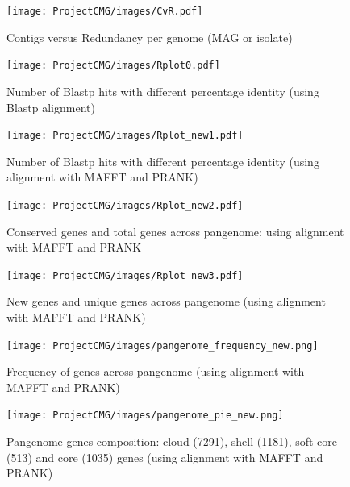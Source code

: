 \documentclass[11pt]{article}
\begin{document}
\begin{figure}[!htb]
     \centering
     \texttt{[image: ProjectCMG/images/CvR.pdf]}
     \caption{Contigs versus Redundancy per genome (MAG or isolate)}\label{fig:CvsR}
\end{figure}

\begin{figure}[h!]
    \centering
    \texttt{[image: ProjectCMG/images/Rplot0.pdf]}
    \caption{Number of Blastp hits with different percentage identity (using Blastp alignment)}
    \label{fig:roary1_1}    
\end{figure}

\begin{figure}[h!]
    \centering
    \texttt{[image: ProjectCMG/images/Rplot\_new1.pdf]}
    \caption{Number of Blastp hits with different percentage identity (using alignment with MAFFT and PRANK)}
    \label{fig:roary2_1}
    \end{figure}

\begin{figure}[!htb]
   \begin{minipage}{0.48\textwidth}
     \centering
     \texttt{[image: ProjectCMG/images/Rplot\_new2.pdf]}
     \caption{Conserved genes and total genes across pangenome: using alignment with MAFFT and PRANK}\label{fig:roary2_2}
   \end{minipage}\hfill
   \begin{minipage}{0.48\textwidth}
     \centering
     \texttt{[image: ProjectCMG/images/Rplot\_new3.pdf]}
     \caption{New genes and unique genes across pangenome (using alignment with MAFFT and PRANK)}\label{fig:roary2_3}
   \end{minipage}
\end{figure}

\begin{figure}
    \centering
    \texttt{[image: ProjectCMG/images/pangenome\_frequency\_new.png]}
    \caption{Frequency of genes across pangenome (using alignment with MAFFT and PRANK)}\label{fig:roary2_freq}
\end{figure}


\begin{figure}
    \centering
    \texttt{[image: ProjectCMG/images/pangenome\_pie\_new.png]}
     \caption{Pangenome genes composition: cloud (7291), shell (1181), soft-core (513) and core (1035) genes (using alignment with MAFFT and PRANK)}\label{fig:roary2_pie}
\end{figure}
\end{document}
